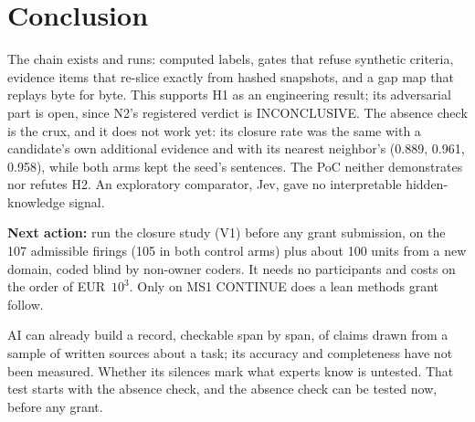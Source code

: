 \section{Conclusion}\label{sec:conclusion}

\evobs{} The chain exists and runs: computed labels, gates that refuse synthetic criteria, evidence
items that re-slice exactly from hashed snapshots, and a gap map that replays byte for byte. This supports
H1 as an engineering result; its adversarial part is open, since N2's registered
verdict is INCONCLUSIVE. The absence check is the crux, and it does not work yet: its closure rate was the
same with a candidate's own additional evidence and with its nearest neighbor's (0.889, 0.961, 0.958),
while both arms kept the seed's sentences. \evint{} The PoC neither demonstrates nor refutes H2. An
exploratory comparator, Jev, gave no interpretable hidden-knowledge signal.

\evfut{} \textbf{Next action:} run the closure study (V1) before any grant submission, on the 107 admissible firings (105 in both control arms) plus about 100 units from a new domain, coded blind by non-owner coders. It needs no participants and costs on
the order of EUR~$10^3$. Only on MS1 CONTINUE does a lean methods grant follow.

\begin{findingbox}[unbreakable]
  AI can already build a record, checkable span by span, of claims drawn from a sample of written sources about a task; its accuracy and completeness have not been measured. Whether its
  silences mark what experts know is untested. That test starts with the absence check, and the absence
  check can be tested now, before any grant.
\end{findingbox}
